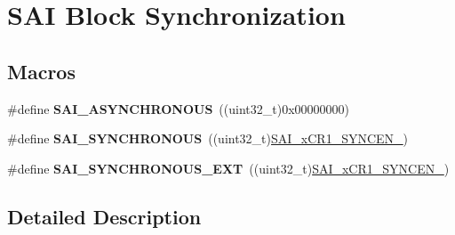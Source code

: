 \hypertarget{group___s_a_i___block___synchronization}{}\section{S\+AI Block Synchronization}
\label{group___s_a_i___block___synchronization}
\subsection*{Macros}
\begin{DoxyCompactItemize}
\item 
\#define {\bfseries S\+A\+I\+\_\+\+A\+S\+Y\+N\+C\+H\+R\+O\+N\+O\+US}~((uint32\+\_\+t)0x00000000)\hypertarget{group___s_a_i___block___synchronization_gae1da17610b13bf0c39f992b372f579d4}{}\label{group___s_a_i___block___synchronization_gae1da17610b13bf0c39f992b372f579d4}

\item 
\#define {\bfseries S\+A\+I\+\_\+\+S\+Y\+N\+C\+H\+R\+O\+N\+O\+US}~((uint32\+\_\+t)\hyperlink{group___peripheral___registers___bits___definition_gab62d1d3571fbfe85bdaa913b2911856e}{S\+A\+I\+\_\+x\+C\+R1\+\_\+\+S\+Y\+N\+C\+E\+N\+\_})\hypertarget{group___s_a_i___block___synchronization_gad7948782088bf8d310207041094c3df8}{}\label{group___s_a_i___block___synchronization_gad7948782088bf8d310207041094c3df8}

\item 
\#define {\bfseries S\+A\+I\+\_\+\+S\+Y\+N\+C\+H\+R\+O\+N\+O\+U\+S\+\_\+\+E\+XT}~((uint32\+\_\+t)\hyperlink{group___peripheral___registers___bits___definition_gad59a87c05a0e147d3ed2364ccf91b18b}{S\+A\+I\+\_\+x\+C\+R1\+\_\+\+S\+Y\+N\+C\+E\+N\+\_})\hypertarget{group___s_a_i___block___synchronization_ga14be5593f2f4de9699b49f5e307e98fe}{}\label{group___s_a_i___block___synchronization_ga14be5593f2f4de9699b49f5e307e98fe}

\end{DoxyCompactItemize}


\subsection{Detailed Description}
